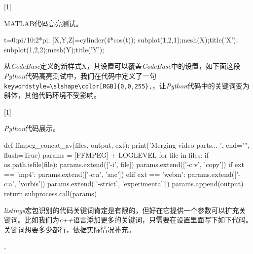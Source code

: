 \begin{latex}

[1]{\lstset{style=Matlab}}{}
\end{latex}

MATLAB代码高亮测试。

\begin{Matlab}{}
t=0:pi/10:2*pi;
[X,Y,Z]=cylinder(4*cos(t));
subplot(1,2,1);mesh(X);title('X');
subplot(1,2,2);mesh(Y);title('Y');
\end{Matlab}

从\emph{CodeBase}定义的新样式X，其设置可以覆盖\emph{CodeBase}中的设置，如下面这段\emph{Python}代码高亮测试中，我们在代码中定义了一句\verb|keywordstyle=\slshape\color[RGB]{0,0,255},|，让\emph{Python}代码中的关键词变为斜体，其他代码环境不受影响。

\begin{latex}
[1]{\lstset{style=python}}{}
\end{latex}

\emph{Python}代码展示。

\begin{python}{}
def ffmpeg_concat_av(files, output, ext):
    print('Merging video parts... ', end="", flush=True)
    params = [FFMPEG] + LOGLEVEL
    for file in files:
        if os.path.isfile(file): params.extend(['-i', file])
    params.extend(['-c:v', 'copy'])
    if ext == 'mp4':
        params.extend(['-c:a', 'aac'])
    elif ext == 'webm':
        params.extend(['-c:a', 'vorbis'])
    params.extend(['-strict', 'experimental'])
    params.append(output)
    return subprocess.call(params)
\end{python}

\emph{listings}宏包识别的代码关键词肯定是有限的，但好在它提供一个参数可以扩充关键词。比如我们为\emph{c++}语言添加更多的关键词，只需要在设置里面写下如下代码。关键词想要多少都行，依据实际情况补充。

\begin{latex}
,
\end{latex}


